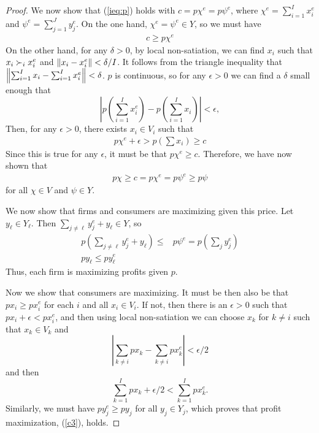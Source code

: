 \begin{proof}
  We now show that (\ref{ieq:p}) holds with $c = p \chi^e = p \psi^e$,
  where $\chi^e = \sum_{i=1}^I x_i^e$ and
  $\psi^e = \sum_{j=1}^J y_j^e$. On the one hand,
  $\chi^e = \psi^e \in Y$, so we must have
  \begin{align*}
    c \geq p \chi^e 
  \end{align*}
  On the other hand, for any $\delta > 0$, by local non-satiation, we
  can find $x_i$ such that $x_i \succ_i x_i^e$ and
  $\left\Vert {x_i - x_i^e} \right\Vert<\delta/I$. It follows from the triangle
  inequality that
  $\left\Vert {\sum_{i=1}^I x_i - \sum_{i=1}^I x_i^e } \right\Vert < \delta$. $p$ is
  continuous, so for any $\epsilon>0$ we can find a $\delta$ small
  enough that
  \[
  \left\vert p\left( \sum_{i=1}^I  x^e_i \right) - p\left(\sum_{i=1}^I
      x_i\right) \right\vert < \epsilon,
  \]
  Then, for any $\epsilon >0$, there exists $x_i \in V_i$ such that
  \begin{align*}
    p \chi^e + \epsilon > p (\sum x_i) \geq c
  \end{align*}
  Since this is true for any $\epsilon$, it must be
  that $p \chi^e \geq c$. Therefore, we have now shown
  that
  \begin{align}
    p\chi \geq c = p \chi^e = p \psi^e \geq p \psi
  \end{align}  
  for all $\chi \in V$ and $\psi \in Y$. 

  We now show that firms and consumers are maximizing given this
  price. Let $y_\ell \in Y_\ell$. Then $\sum_{j \neq \ell} y_j^e +
  y_\ell \in Y$, so
  \begin{align*}
    p\left( \sum_{j \neq \ell} y_j^e +  y_\ell \right) \leq
    & p \psi^e = p\left( \sum_j y_j^e \right) \\
    p y_\ell \leq p y_\ell^e
  \end{align*}
  Thus, each firm is maximizing profits given $p$.
  
  Now we show that consumers are maximizing.
  It must be then also be that $p x_i \geq p x_i^e $ for each $i$ and
  all $x_i \in V_i$. If not, then there is an $\epsilon>0$ such that
  $p x_i + \epsilon < p x_i^e$, and then using local non-satiation we
  can choose $x_k$ for $k\neq i$ such that $x_k \in V_k$ and 
  \[\left| \sum_{
      k \neq i } px_k - \sum_{k \neq i } p x_k^e \right| < \epsilon/2
  \]
  and then 
  \[ \sum_{k=1}^I p x_k + \epsilon/2 < \sum_{k=1}^I p x_k^e. \]
  Similarly, we must have $p y_j^e \geq p y_j$ for all $y_j \in Y_j$,
  which proves that profit maximization, (\ref{c3}), holds. 


\end{proof}
